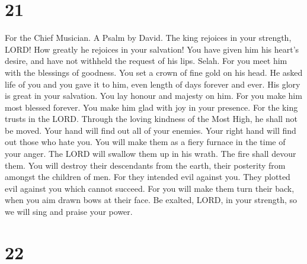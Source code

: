 \hypertarget{section-20}{%
\section{21}\label{section-20}}

For the Chief Musician. A Psalm by David.  The king rejoices
in your strength, LORD! How greatly he rejoices in your salvation!
 You have given him his heart's desire, and have not
withheld the request of his lips. Selah.  For you meet him
with the blessings of goodness. You set a crown of fine gold on his
head.  He asked life of you and you gave it to him, even
length of days forever and ever.  His glory is great in your
salvation. You lay honour and majesty on him.  For you make
him most blessed forever. You make him glad with joy in your presence.
 For the king trusts in the LORD. Through the loving
kindness of the Most High, he shall not be moved.  Your hand
will find out all of your enemies. Your right hand will find out those
who hate you.  You will make them as a fiery furnace in the
time of your anger. The LORD will swallow them up in his wrath. The fire
shall devour them.  You will destroy their descendants from
the earth, their posterity from amongst the children of men.
 For they intended evil against you. They plotted evil
against you which cannot succeed.  For you will make them
turn their back, when you aim drawn bows at their face.  Be
exalted, LORD, in your strength, so we will sing and praise your power.

\hypertarget{section-21}{%
\section{22}\label{section-21}}

